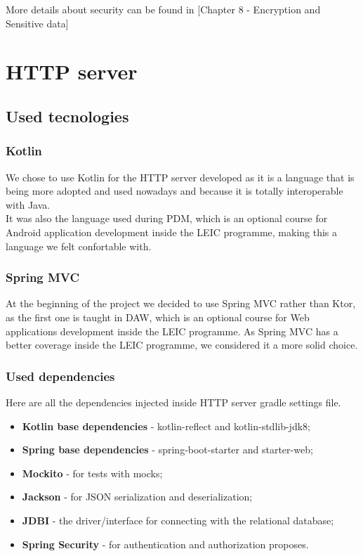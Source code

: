 More details about security can be found in [Chapter 8 - Encryption and Sensitive data]\\

\section{HTTP server}

\subsection{Used tecnologies}

\subsubsection{Kotlin}

We chose to use Kotlin\cite{kotlin} for the HTTP server developed as it is a language that is being more adopted and used nowadays and because it is totally 
interoperable with Java\cite{java}.\\

It was also the language used during PDM, which is an optional course for Android application development inside the LEIC programme, 
making this a language we felt confortable with.\\

\subsubsection{Spring MVC}

At the beginning of the project we decided to use Spring MVC\cite{springmvc} rather than Ktor\cite{ktor}, as the first one is taught in DAW, which is an optional course
for Web applications development inside the LEIC programme. As Spring MVC has a better coverage inside the LEIC programme, we considered 
it a more solid choice.\\

\subsubsection{Used dependencies}

Here are all the dependencies injected inside HTTP server gradle settings file.\\

\begin{itemize}
    \item \textbf{Kotlin base dependencies} - kotlin-reflect and kotlin-stdlib-jdk8;
    \item \textbf{Spring base dependencies} - spring-boot-starter and starter-web;
    \item \textbf{Mockito} - for tests with mocks;
    \item \textbf{Jackson} - for JSON serialization and deserialization;
    \item \textbf{JDBI} - the driver/interface for connecting with the relational database;
    \item \textbf{Spring Security} - for authentication and authorization proposes.
\end{itemize}

